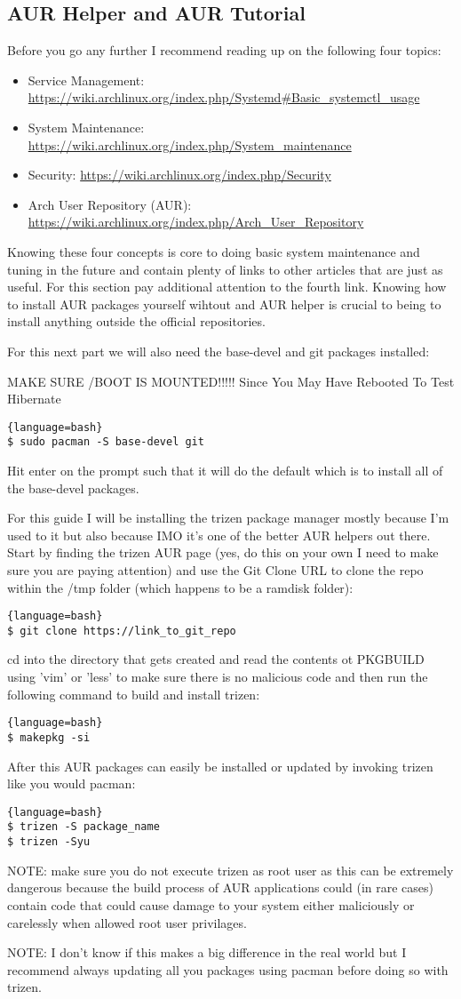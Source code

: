 \subsection{AUR Helper and AUR Tutorial}
Before you go any further I recommend reading up on the following four topics:
\begin{itemize}
    \item Service Management: \url{https://wiki.archlinux.org/index.php/Systemd#Basic_systemctl_usage}
    \item System Maintenance: \url{https://wiki.archlinux.org/index.php/System_maintenance}
    \item Security: \url{https://wiki.archlinux.org/index.php/Security}
    \item Arch User Repository (AUR): \url{https://wiki.archlinux.org/index.php/Arch_User_Repository}
\end{itemize}
Knowing these four concepts is core to doing basic system maintenance and tuning in the future and contain plenty of links to other articles that are just as useful. For this section pay additional attention to the fourth link. Knowing how to install AUR packages yourself wihtout and AUR helper is crucial to being to install anything outside the official repositories.

For this next part we will also need the base-devel and git packages installed:

MAKE SURE /BOOT IS MOUNTED!!!!! Since You May Have Rebooted To Test Hibernate
\begin{lstlisting}{language=bash}
$ sudo pacman -S base-devel git
\end{lstlisting}
Hit enter on the prompt such that it will do the default which is to install all of the base-devel packages.

For this guide I will be installing the trizen package manager mostly because I'm used to it but also because IMO it's one of the better AUR helpers out there.
Start by finding the trizen AUR page (yes, do this on your own I need to make sure you are paying attention) and use the Git Clone URL to clone the repo within the /tmp folder (which happens to be a ramdisk folder):
\begin{lstlisting}{language=bash}
$ git clone https://link_to_git_repo
\end{lstlisting}
cd into the directory that gets created and read the contents ot PKGBUILD using 'vim' or 'less' to make sure there is no malicious code and then run the following command to build and install trizen:
\begin{lstlisting}{language=bash}
$ makepkg -si
\end{lstlisting}
After this AUR packages can easily be installed or updated by invoking trizen like you would pacman:
\begin{lstlisting}{language=bash}
$ trizen -S package_name
$ trizen -Syu
\end{lstlisting}
NOTE: make sure you do not execute trizen as root user as this can be extremely dangerous because the build process of AUR applications could (in rare cases) contain code that could cause damage to your system either maliciously or carelessly when allowed root user privilages.

NOTE: I don't know if this makes a big difference in the real world but I recommend always updating all you packages using pacman before doing so with trizen.




